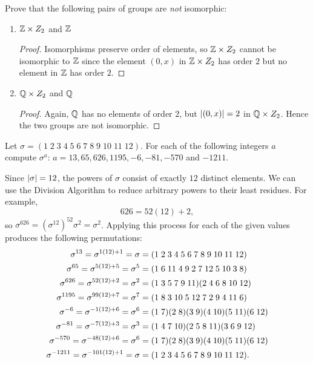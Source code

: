  Prove that the following pairs of groups are {\em not}
isomorphic:
\begin{enumerate}
\item $\mathbb{Z}\times Z_2$ and $\mathbb{Z}$
  \begin{proof}
    Isomorphisms preserve order of elements, so $\mathbb{Z}\times Z_2$ cannot
    be isomorphic to $\mathbb{Z}$ since the element $(0,x)$ in $\mathbb{Z}\times Z_2$
    has order $2$ but no element in $\mathbb{Z}$ has order $2$.
  \end{proof}
\item $\mathbb{Q}\times Z_2$ and $\mathbb{Q}$
  \begin{proof}
    Again, $\mathbb{Q}$ has no elements of order $2$, but $\lvert{(0,x)}\rvert = 2$ in
    $\mathbb{Q}\times Z_2$. Hence the two groups are not isomorphic.
  \end{proof}
\end{enumerate}

 Let $\sigma =
(1\;2\;3\;4\;5\;6\;7\;8\;9\;10\;11\;12)$. For each of the following
integers $a$ compute $\sigma^a$:
$a = 13, 65, 626, 1195, -6, -81, -570$ and $-1211$.
\begin{solution}
  Since $\lvert{\sigma}\rvert = 12$, the powers of $\sigma$ consist of exactly
  $12$ distinct elements. We can use the Division Algorithm to reduce
  arbitrary powers to their least residues. For example,
  \begin{equation*}
    626 = 52(12) + 2,
  \end{equation*}
  so $\sigma^{626} = (\sigma^{12})^{52}\sigma^2 = \sigma^2$. Applying
  this process for each of the given values produces the following
  permutations:
  \begin{align*}
    \sigma^{13} = \sigma^{1(12) + 1} = \sigma
    &= (1\;2\;3\;4\;5\;6\;7\;8\;9\;10\;11\;12) \\
    \sigma^{65} = \sigma^{5(12) + 5} = \sigma^5
    &= (1\;6\;11\;4\;9\;2\;7\;12\;5\;10\;3\;8) \\
    \sigma^{626} = \sigma^{52(12)+2} = \sigma^2
    &= (1\;3\;5\;7\;9\;11)(2\;4\;6\;8\;10\;12) \\
    \sigma^{1195} = \sigma^{99(12)+7} = \sigma^7
    &= (1\;8\;3\;10\;5\;12\;7\;2\;9\;4\;11\;6) \\
    \sigma^{-6} = \sigma^{-1(12)+6} = \sigma^6
    &= (1\;7)(2\;8)(3\;9)(4\;10)(5\;11)(6\;12) \\
    \sigma^{-81} = \sigma^{-7(12)+3} = \sigma^3
    &= (1\;4\;7\;10)(2\;5\;8\;11)(3\;6\;9\;12) \\
    \sigma^{-570} = \sigma^{-48(12)+6} = \sigma^6
    &= (1\;7)(2\;8)(3\;9)(4\;10)(5\;11)(6\;12) \\
    \sigma^{-1211} = \sigma^{-101(12)+1} = \sigma
    &= (1\;2\;3\;4\;5\;6\;7\;8\;9\;10\;11\;12). \qedhere
  \end{align*}
\end{solution}

